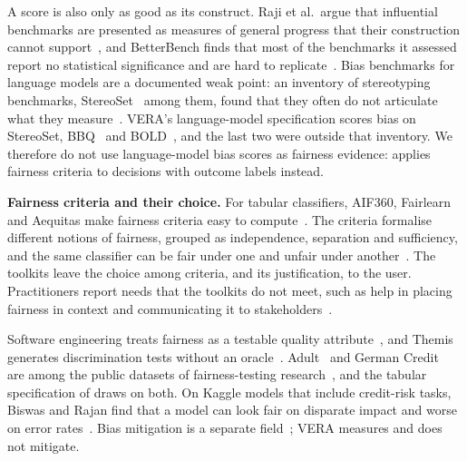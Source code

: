 A score is also only as good as its construct.
Raji et al.\ argue that influential benchmarks are presented as measures of general progress that their construction cannot support~\cite{raji2021everything}, and BetterBench finds that most of the benchmarks it assessed report no statistical significance and are hard to replicate~\cite{reuel2024betterbench}.
Bias benchmarks for language models are a documented weak point: an inventory of stereotyping benchmarks, StereoSet~\cite{nadeem2021stereoset} among them, found that they often do not articulate what they measure~\cite{blodgett2021stereotyping}.
VERA's language-model specification scores bias on StereoSet, BBQ~\cite{parrish2022bbq} and BOLD~\cite{dhamala2021bold}, and the last two were outside that inventory.
We therefore do not use language-model bias scores as fairness evidence:  applies fairness criteria to decisions with outcome labels instead.

\ifarmfull
\textbf{Fairness criteria and their choice.}
For tabular classifiers, AIF360, Fairlearn and Aequitas make fairness criteria easy to compute~\cite{bellamy2019aif360,weerts2023fairlearn,saleiro2018aequitas}.
The criteria formalise different notions of fairness, grouped as independence, separation and sufficiency, and the same classifier can be fair under one and unfair under another~\cite{verma2018fairness,barocas2023fairness}.
The toolkits leave the choice among criteria, and its justification, to the user.
Practitioners report needs that the toolkits do not meet, such as help in placing fairness in context and communicating it to stakeholders~\cite{lee2021landscape,deng2022exploring}.

Software engineering treats fairness as a testable quality attribute~\cite{brun2018software}, and Themis generates discrimination tests without an oracle~\cite{galhotra2017fairness}.
Adult~\cite{becker1996adult} and German Credit~\cite{hofmann1994statlog} are among the public datasets of fairness-testing research~\cite{chen2024fairness,chakraborty2021bias}, and the tabular specification of  draws on both.
On Kaggle models that include credit-risk tasks, Biswas and Rajan find that a model can look fair on disparate impact and worse on error rates~\cite{biswas2020machine}.
Bias mitigation is a separate field~\cite{hort2024bias}; VERA measures and does not mitigate.
\fi

